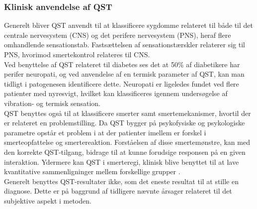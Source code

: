 \subsubsection{Klinisk anvendelse af QST}
Generelt bliver QST anvendt til at klassificere sygdomme relateret til både til det centrale nervesystem (CNS) og det perifere nervesystem (PNS), heraf flere omhandlende sensationstab. Fastsættelsen af sensationstærskler relaterer sig til PNS, hvorimod smertekontrol relateres til CNS. \\ 
Ved benyttelse af QST relateret til diabetes ses det at 50\% af diabetikere har perifer neuropati, og ved anvendelse af en termisk parameter af QST, kan man tidligt i patogenesen identificere dette. Neuropati er ligeledes fundet ved flere patienter med nyresvigt, hvilket kan klassificeres igennem undersøgelse af vibration- og termisk sensation. \citep{Yarnitsky1997} \citep{Yarnitsky2006} \\
QST benyttes også til at klassificere smerter samt smertemekanismer, hvortil der er relateret en problemstilling. Da QST bygger på psykofysiske og psykologiske parametre opstår et problem i at der patienter imellem er forskel i smerteopfattelse og smertereaktion. \citep{Yarnitsky1997} Forståelsen af disse smertemønstre, kan med den korrekte QST-tilgang, bidrage til at kunne forudsige responsen på en given interaktion. \citep{Yarnitsky2006} Ydermere kan QST i smerteregi, klinisk blive benyttet til at lave kvantitative sammenligninger mellem forskellige grupper \citep{Arendt-Nielsen2009}. \\
Generelt benyttes QST-resultater ikke, som det eneste resultat til at stille en diagnose. Dette er på baggrund af tidligere nævnte årsager relateret til det subjektive aspekt i metoden. \citep{Yarnitsky2006}

